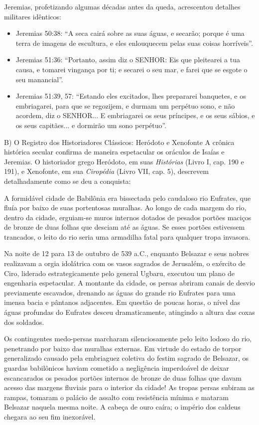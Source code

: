 \documentclass[11pt,a4paper,openany]{book}
\begin{document}
Jeremias, profetizando algumas décadas antes da queda, acrescentou detalhes militares idênticos:
\begin{itemize}
  \item Jeremias 50:38: ``A seca cairá sobre as suas águas, e secarão; porque é uma terra de imagens de escultura, e eles enlouquecem pelas suas coisas horríveis''.
  \item Jeremias 51:36: ``Portanto, assim diz o SENHOR: Eis que pleitearei a tua causa, e tomarei vingança por ti; e secarei o seu mar, e farei que se esgote o seu manancial''.
  \item Jeremias 51:39, 57: ``Estando eles excitados, lhes prepararei banquetes, e os embriagarei, para que se regozijem, e durmam um perpétuo sono, e não acordem, diz o SENHOR... E embriagarei os seus príncipes, e os seus sábios, e os seus capitães... e dormirão um sono perpétuo''.
\end{itemize}


B) O Registro dos Historiadores Clássicos: Heródoto e Xenofonte
A crônica histórica secular confirma de maneira espetacular os oráculos de Isaías e Jeremias. O historiador grego Heródoto, em suas \textit{Histórias} (Livro I, cap. 190 e 191), e Xenofonte, em sua \textit{Ciropédia} (Livro VII, cap. 5), descrevem detalhadamente como se deu a conquista:

A formidável cidade de Babilônia era bissectada pelo caudaloso rio Eufrates, que fluía por baixo de suas portentosas muralhas. Ao longo de cada margem do rio, dentro da cidade, erguiam-se muros internos dotados de pesados portões maciços de bronze de duas folhas que desciam até as águas. Se esses portões estivessem trancados, o leito do rio seria uma armadilha fatal para qualquer tropa invasora.

Na noite de 12 para 13 de outubro de 539 a.C., enquanto Belsazar e seus nobres realizavam a orgia idolátrica com os vasos sagrados de Jerusalém, o exército de Ciro, liderado estrategicamente pelo general Ugbaru, executou um plano de engenharia espetacular. A montante da cidade, os persas abriram canais de desvio previamente escavados, drenando as águas do grande rio Eufrates para uma imensa bacia e pântanos adjacentes. Em questão de poucas horas, o nível das águas profundas do Eufrates desceu dramaticamente, atingindo a altura das coxas dos soldados.

Os contingentes medo-persas marcharam silenciosamente pelo leito lodoso do rio, penetrando por baixo das muralhas externas. Em virtude do estado de torpor generalizado causado pela embriaguez coletiva do festim sagrado de Belsazar, os guardas babilônicos haviam cometido a negligência imperdoável de deixar escancarados os pesados portões internos de bronze de duas folhas que davam acesso das margens fluviais para o interior da cidade! As tropas persas subiram as rampas, tomaram o palácio de assalto com resistência mínima e mataram Belsazar naquela mesma noite. A cabeça de ouro caíra; o império dos caldeus chegara ao seu fim inexorável.
\end{document}
